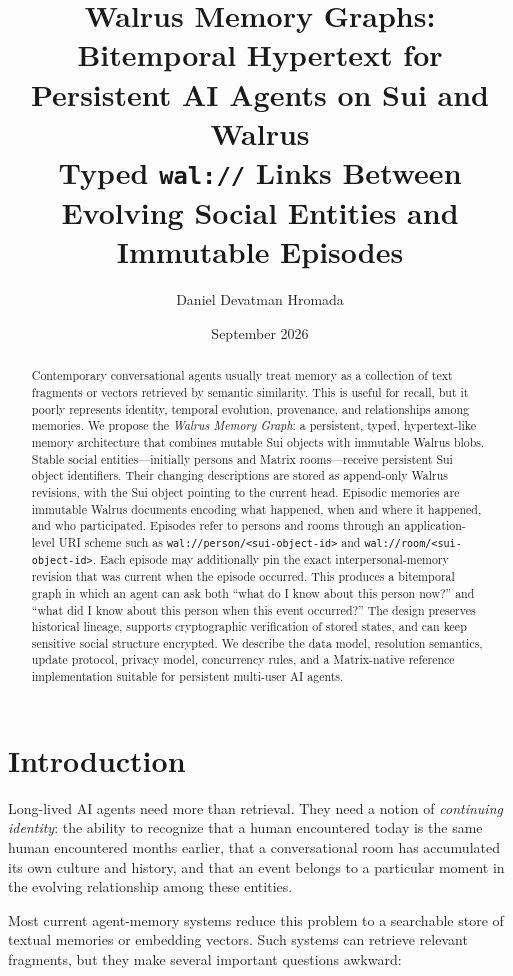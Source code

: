 \documentclass[11pt]{article}
\title{\textbf{Walrus Memory Graphs: Bitemporal Hypertext for Persistent AI Agents on Sui and Walrus}\\
\large Typed \texttt{wal://} Links Between Evolving Social Entities and Immutable Episodes}
\author{Daniel Devatman Hromada}
\date{September 2026}
\begin{document}
\maketitle

\begin{abstract}
Contemporary conversational agents usually treat memory as a collection of text fragments or vectors retrieved by semantic similarity. This is useful for recall, but it poorly represents identity, temporal evolution, provenance, and relationships among memories. We propose the \emph{Walrus Memory Graph}: a persistent, typed, hypertext-like memory architecture that combines mutable Sui objects with immutable Walrus blobs. Stable social entities---initially persons and Matrix rooms---receive persistent Sui object identifiers. Their changing descriptions are stored as append-only Walrus revisions, with the Sui object pointing to the current head. Episodic memories are immutable Walrus documents encoding what happened, when and where it happened, and who participated. Episodes refer to persons and rooms through an application-level URI scheme such as \texttt{wal://person/<sui-object-id>} and \texttt{wal://room/<sui-object-id>}. Each episode may additionally pin the exact interpersonal-memory revision that was current when the episode occurred. This produces a bitemporal graph in which an agent can ask both ``what do I know about this person now?'' and ``what did I know about this person when this event occurred?'' The design preserves historical lineage, supports cryptographic verification of stored states, and can keep sensitive social structure encrypted. We describe the data model, resolution semantics, update protocol, privacy model, concurrency rules, and a Matrix-native reference implementation suitable for persistent multi-user AI agents.
\end{abstract}

\section{Introduction}

Long-lived AI agents need more than retrieval. They need a notion of \emph{continuing identity}: the ability to recognize that a human encountered today is the same human encountered months earlier, that a conversational room has accumulated its own culture and history, and that an event belongs to a particular moment in the evolving relationship among these entities.

Most current agent-memory systems reduce this problem to a searchable store of textual memories or embedding vectors. Such systems can retrieve relevant fragments, but they make several important questions awkward:
\end{document}
